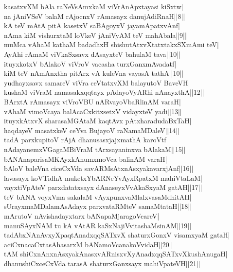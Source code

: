 \documentclass{article}
\begin{document}
kasatxvXM bAla  raNeVsAmxkaM viVrAnApxtayasi kiSxtw|\\
na jAniVSeV balaM rAjocnxV rAmasayx danujAdiRnaH||8||\\
kA teV mAtA pitA kasetxV saBAgoyxV jayamApatxvAnf|\\
nAma kiM vishurxtaM loVkeV jAniVyAM teV mahAbala||9||\\
muMca vAhaM kathaM badadhxH shishutAtxvXtatxtakxSXmAmi teV|\\
AyAhi rAmaM viVkaSxsavx dAsayxteV bahulaM tava||10||\\
ituyxkotxV bAlakoV viVroV vacasha turxGanxmAvadatf|\\
kiM teV nAmAnxtha pitArx vA kuleVna vayasA tathA||10||\\
yudhayxsavx samareV viVra ceVtatxvXM balayutoV BaveVH|\\
kushaM viVraM namasakxqqtayx pAdayoVyARhi nAnayxthA||12||\\
BArxtA rAmasayx viVroVBU nARvayoVbaRlinAM varaH|\\
vAhaM vimoVcaya balAcaCxkitxsetxV vidayxteV yadi||13||\\
ituyxkAtxvX sharasaMGAtaM kaqtAvx pAtxharadudaBxTaH|\\
haqdayeV masatxkeV ceYva BujayoV raNamaMDaleV||14||\\
tadA parxkupitoV rAjA dhanusasxjajxmathA karoVtf\\
nAdayanemxVGagaMBiVraM tArxsayaninxva bAlakaM||15||\\
bANAnaparisaMKAyxkAnumxmoVca balinAM varaH|\\
bAloV baleVna ciceCxVda savARMsAtxnAsxyakavarxjAnf||16||\\
lavasayx koVTidhA muketxYbARNeYvAyxRpatxM mahiVtaLaM|\\
vayxtiVpAteV parxdatatxsayx dAnaseyxVvAkaSxyaM gatAH||17||\\
teV bANA voyxVma sakalaM vAyxpunxvaMlalxvasaMdhitAH|\\
sUrayxmaMDalamAsAdayx parxvataRMteV samaMtataH||18||\\
mArutoV nAvishadayxtarx bANapaMjaragoVcareV|\\
manuSAyxNAM tu kA vAtAR kaSxNajiVvitashaMsinAM||19||\\
tadAbxNAnAvxyXpaqtAnadxqqSATxvX shaturxGonxV visamxyaM gataH|\\
aciCxnacaCxtasAhasarxM bANamoVcanakoVvidaH||20||\\
tAM shiCxnAnxnAsxyakAnasxvARnisxvXyAnadxqqSATxvXkushAnugaH|\\
dhanushiCxceCxVda tarasA shaturxGanxsayx mahiVpateVH||21||\\
\end{document}
